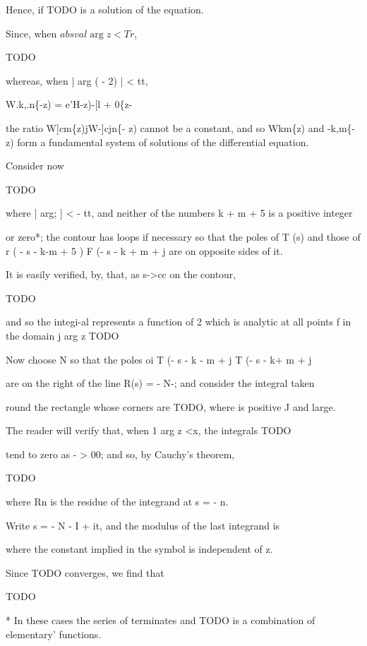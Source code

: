 Hence, if TODO is a solution of the equation.

Since, when $absval{\arg z} < Tr$,

TODO

whereas, when | arg ( - 2) | < tt,

W.k,.n\{-z) = e'H-z)-[l + 0\{z-%

the ratio W]cm\{z)jW-]cjn\{- z) cannot be a constant, and so
Wkm\{z) and -k,m\{- z) form a fundamental system of solutions of
the differential equation.


Consider now

TODO

where | arg; ] < - tt, and neither of the numbers k + m + 5 is a
positive integer

%
%

or zero*; the contour has loops if necessary so that the poles of T
(s) and those of r ( - s - k-m + 5 ) F (- s - k + m + j are on
opposite sides of it.

It is easily verified, by, that, as s->cc on the contour,

TODO

and so the integi-al represents a function of 2 which is analytic at
all points f in the domain j arg z TODO

Now choose N so that the poles oi T (- s - k - m + j T (- s - k+ m +
j

are on the right of the line R(s) = - N-; and consider the integral
taken

round the rectangle whose corners are TODO, where  is
positive J and large.

The reader will verify that, when 1 arg z <x, the integrals TODO

tend to zero as - > 00; and so, by Cauchy's theorem,

TODO

where Rn is the residue of the integrand at s = - n.

Write s = - N - I + it, and the modulus of the last integrand is

where the constant implied in the symbol is independent of z.

Since TODO converges, we find that

TODO

* In these cases the series of terminates and TODO is a
combination of elementary' functions.


